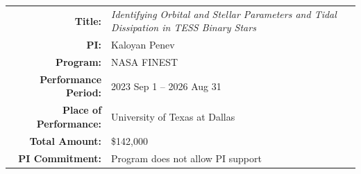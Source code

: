 \begin{tabularx}{1.0\textwidth}{rX}
    \textbf{Title:} & {\em  Identifying Orbital and Stellar Parameters and Tidal Dissipation in TESS Binary Stars}\\
    \textbf{PI:} & Kaloyan Penev\\
    \textbf{Program:} & NASA FINEST\\
    \textbf{Performance Period:} & 2023 Sep 1 -- 2026 Aug 31\\
    \textbf{Place of Performance:} & University of Texas at Dallas\\
    \textbf{Total Amount:} & \$142,000 \\
    \textbf{PI Commitment:} & Program does not allow PI support\\
\end{tabularx}
